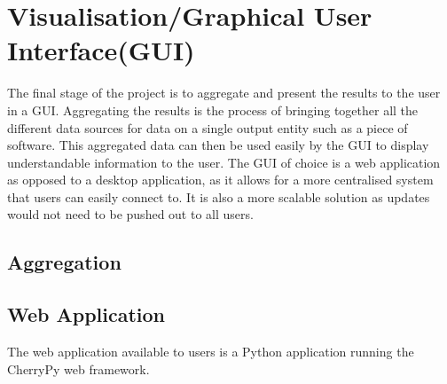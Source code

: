 
\section[Visualisation]{Visualisation/Graphical User Interface(GUI)}
The final stage of the project is to aggregate and present the results to the user in a GUI.
Aggregating the results is the process of bringing together all the different data sources for data on a single output entity such as a piece of software. This aggregated data can then be used easily by the GUI to display understandable information to the user.
The GUI of choice is a web application as opposed to a desktop application, as it allows for a more centralised system that users can easily connect to. It is also a more scalable solution as updates would not need to be pushed out to all users.

\subsection{Aggregation}

\subsection{Web Application}
The web application available to users is a Python application running the CherryPy web framework.